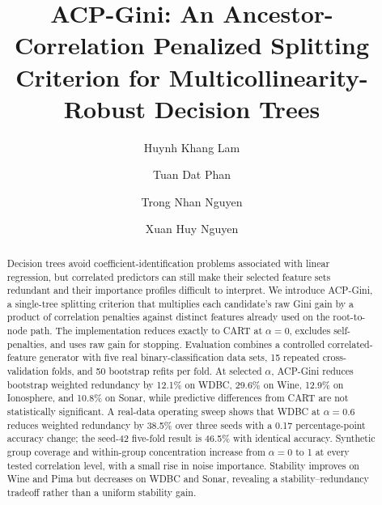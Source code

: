 \documentclass[runningheads]{llncs}
\begin{document}
\title{ACP-Gini: An Ancestor-Correlation Penalized Splitting Criterion for Multicollinearity-Robust Decision Trees}
\author{Huynh Khang Lam \and Tuan Dat Phan \and Trong Nhan Nguyen \and Xuan Huy Nguyen}
\maketitle

\begin{abstract}
Decision trees avoid coefficient-identification problems associated with linear regression, but correlated predictors can still make their selected feature sets redundant and their importance profiles difficult to interpret. We introduce ACP-Gini, a single-tree splitting criterion that multiplies each candidate's raw Gini gain by a product of correlation penalties against distinct features already used on the root-to-node path. The implementation reduces exactly to CART at $\alpha=0$, excludes self-penalties, and uses raw gain for stopping. Evaluation combines a controlled correlated-feature generator with five real binary-classification data sets, 15 repeated cross-validation folds, and 50 bootstrap refits per fold. At selected $\alpha$, ACP-Gini reduces bootstrap weighted redundancy by 12.1\% on WDBC, 29.6\% on Wine, 12.9\% on Ionosphere, and 10.8\% on Sonar, while predictive differences from CART are not statistically significant. A real-data operating sweep shows that WDBC at $\alpha=0.6$ reduces weighted redundancy by 38.5\% over three seeds with a 0.17 percentage-point accuracy change; the seed-42 five-fold result is 46.5\% with identical accuracy. Synthetic group coverage and within-group concentration increase from $\alpha=0$ to 1 at every tested correlation level, with a small rise in noise importance. Stability improves on Wine and Pima but decreases on WDBC and Sonar, revealing a stability--redundancy tradeoff rather than a uniform stability gain.
\end{abstract}
\end{document}
